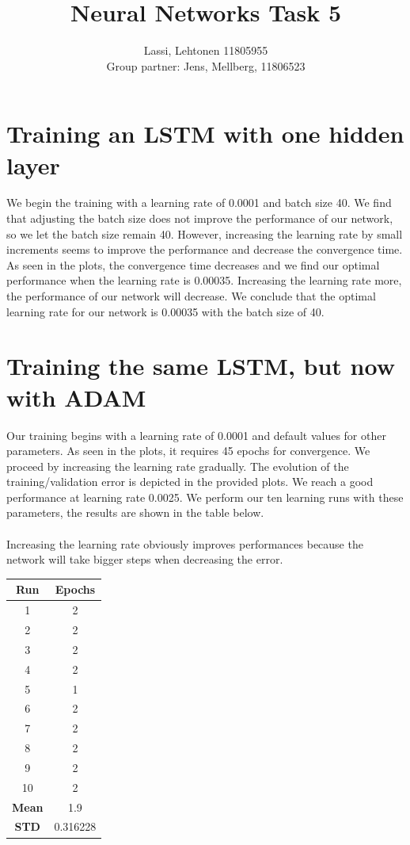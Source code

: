 \documentclass[a4paper]{article}
\title{Neural Networks Task 5}
\author{Lassi, Lehtonen 11805955\\
		Group partner: Jens, Mellberg, 11806523}
\begin{document}
\maketitle



\section{Training an LSTM with one hidden layer}

We begin the training with a learning rate of 0.0001 and batch size 40.
We find that adjusting the batch size does not improve the performance of our network, so we let the batch size remain 40.
However, increasing the learning rate by small increments seems to improve the performance and decrease the convergence time.
As seen in the plots, the convergence time decreases and we find our optimal performance when the learning rate is 0.00035.
Increasing the learning rate more, the performance of our network will decrease.
We conclude that the optimal learning rate for our network is 0.00035 with the batch size of 40.


\section{Training the same LSTM, but now with ADAM}

Our training begins with a learning rate of 0.0001 and default values for other parameters.
As seen in the plots, it requires 45 epochs for convergence. We proceed by increasing the learning rate gradually.
The evolution of the training/validation error is depicted in the provided plots. We reach a good performance at learning rate 0.0025.
We perform our ten learning runs with these parameters, the results are shown in the table below.\\\\
Increasing the learning rate obviously improves performances because the network will take bigger steps when decreasing the error. 

\begin{center}
	    \begin{tabular}{ |c|c|} 
 	        \hline
	        \textbf{Run } & \textbf{Epochs}  \\
	        \hline
	        1 & 2\\
 	        2 & 2\\
 	        3 & 2\\
 	        4 & 2\\
 	       5& 1\\
		6 & 2\\
		7 & 2\\
		8 & 2\\
		9 & 2\\
		10 & 2\\
		\hline
		\textbf{Mean} & 1.9\\
		\hline
		\textbf{STD} & 0.316228\\
 	        \hline
        \end{tabular}
    \end{center}
\end{document}
